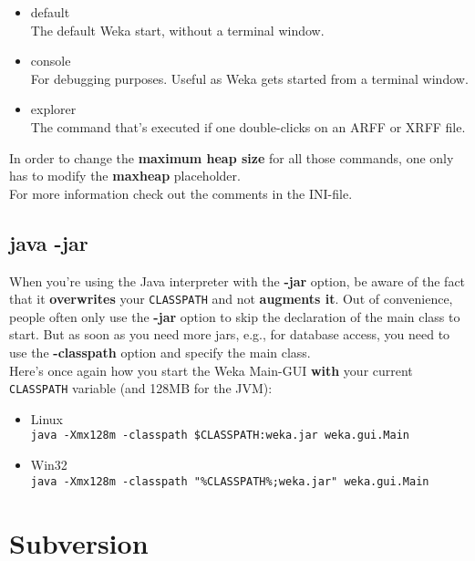\begin{itemize}
\item default\\ The default Weka start, without a terminal window.
\item console\\ For debugging purposes. Useful as Weka gets started from a terminal window.
\item explorer\\ The command that's executed if one double-clicks on an ARFF or XRFF file.
\end{itemize}

\noindent In order to change the \textbf{maximum heap size} for all those commands, one only has
to modify the \textbf{maxheap} placeholder.\\

\noindent For more information check out the comments in the INI-file.

\subsection{java -jar}

When you're using the Java interpreter with the \textbf{-jar} option,
be aware of the fact that it \textbf{overwrites} your \verb=CLASSPATH=
and not \textbf{augments it}. Out of convenience, people often only
use the \textbf{-jar} option to skip the declaration of the main class to
start. But as soon as you need more jars, e.g., for database access,
you need to use the \textbf{-classpath} option and specify the main class.\\

\noindent Here's once again how you start the Weka Main-GUI \textbf{with} your current \verb=CLASSPATH= variable (and 128MB for the JVM):

\begin{itemize}
\item Linux\\ \verb=java -Xmx128m -classpath $CLASSPATH:weka.jar weka.gui.Main=
\item Win32\\ \verb=java -Xmx128m -classpath "%CLASSPATH%;weka.jar" weka.gui.Main=
\end{itemize}


\section{Subversion}

